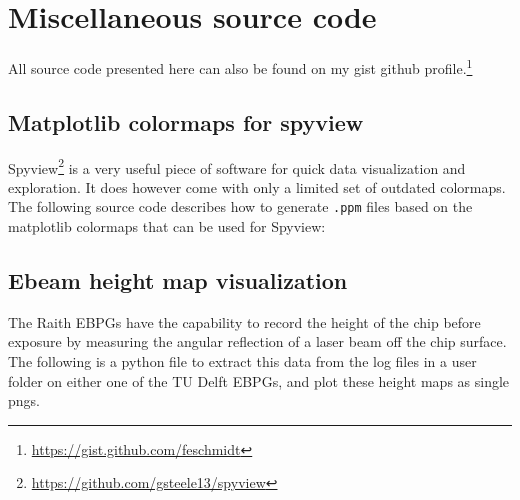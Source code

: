 \newchapstyle
\chapter{Miscellaneous source code}

\afterpage{\pagecolor{none}}\newpage

All source code presented here can also be found on my gist github profile.\footnote{\url{https://gist.github.com/feschmidt}}

\section{Matplotlib colormaps for spyview}\label{app:spyview}
Spyview\footnote{\url{https://github.com/gsteele13/spyview}} is a very useful piece of software for quick data visualization and exploration.
It does however come with only a limited set of outdated colormaps.
The following source code describes how to generate \texttt{.ppm} files based on the matplotlib colormaps that can be used for Spyview:



\clearpage
\section{Ebeam height map visualization}

The Raith EBPGs have the capability to record the height of the chip before exposure by measuring the angular reflection of a laser beam off the chip surface.
%
The following is a python file to extract this data from the log files in a user folder on either one of the TU Delft EBPGs, and plot these height maps as single pngs.




